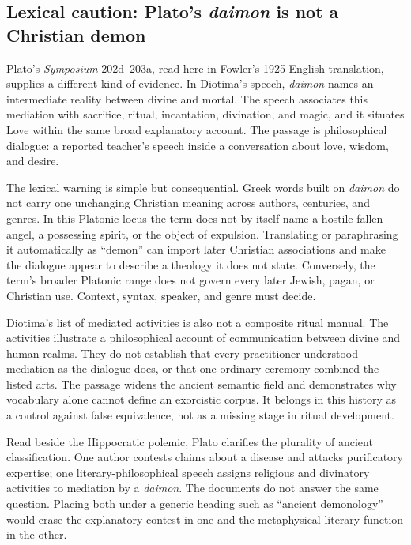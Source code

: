 \subsection{Lexical caution: Plato's \emph{daimon} is not a Christian demon}

Plato's \emph{Symposium} 202d--203a, read here in Fowler's 1925 English
translation, supplies a different kind of evidence. In Diotima's speech,
\emph{daimon} names an intermediate reality between divine and mortal. The
speech associates this mediation with sacrifice, ritual, incantation,
divination, and magic, and it situates Love within the same broad explanatory
account. The passage is philosophical dialogue: a reported teacher's speech
inside a conversation about love, wisdom, and desire.

The lexical warning is simple but consequential. Greek words built on
\emph{daimon} do not carry one unchanging Christian meaning across authors,
centuries, and genres. In this Platonic locus the term does not by itself name
a hostile fallen angel, a possessing spirit, or the object of expulsion.
Translating or paraphrasing it automatically as ``demon'' can import later
Christian associations and make the dialogue appear to describe a theology it
does not state. Conversely, the term's broader Platonic range does not govern
every later Jewish, pagan, or Christian use. Context, syntax, speaker, and
genre must decide.

Diotima's list of mediated activities is also not a composite ritual manual.
The activities illustrate a philosophical account of communication between
divine and human realms. They do not establish that every practitioner
understood mediation as the dialogue does, or that one ordinary ceremony
combined the listed arts. The passage widens the ancient semantic field and
demonstrates why vocabulary alone cannot define an exorcistic corpus. It
belongs in this history as a control against false equivalence, not as a
missing stage in ritual development.

Read beside the Hippocratic polemic, Plato clarifies the plurality of ancient
classification. One author contests claims about a disease and attacks
purificatory expertise; one literary-philosophical speech assigns religious
and divinatory activities to mediation by a \emph{daimon}. The documents do
not answer the same question. Placing both under a generic heading such as
``ancient demonology'' would erase the explanatory contest in one and the
metaphysical-literary function in the other.

